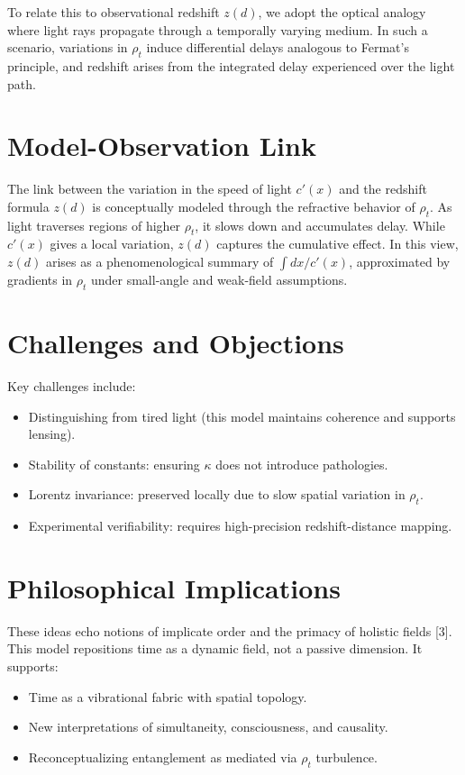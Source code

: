 \documentclass[12pt]{article}
\begin{document}
To relate this to observational redshift $z(d)$, we adopt the optical analogy where light rays propagate through a temporally varying medium. In such a scenario, variations in $\rho_t$ induce differential delays analogous to Fermat's principle, and redshift arises from the integrated delay experienced over the light path.

\section{Model-Observation Link}
The link between the variation in the speed of light $c'(x)$ and the redshift formula $z(d)$ is conceptually modeled through the refractive behavior of $\rho_t$. As light traverses regions of higher $\rho_t$, it slows down and accumulates delay. While $c'(x)$ gives a local variation, $z(d)$ captures the cumulative effect. In this view, $z(d)$ arises as a phenomenological summary of $\int dx / c'(x)$, approximated by gradients in $\rho_t$ under small-angle and weak-field assumptions.

\section{Challenges and Objections}
Key challenges include:
\begin{itemize}
  \item Distinguishing from tired light (this model maintains coherence and supports lensing).
  \item Stability of constants: ensuring \(\kappa\) does not introduce pathologies.
  \item Lorentz invariance: preserved locally due to slow spatial variation in $\rho_t$.
  \item Experimental verifiability: requires high-precision redshift-distance mapping.
\end{itemize}

\section{Philosophical Implications}
These ideas echo notions of implicate order and the primacy of holistic fields [3].
This model repositions time as a dynamic field, not a passive dimension. It supports:
\begin{itemize}
  \item Time as a vibrational fabric with spatial topology.
  \item New interpretations of simultaneity, consciousness, and causality.
  \item Reconceptualizing entanglement as mediated via $\rho_t$ turbulence.
\end{itemize}
\end{document}

